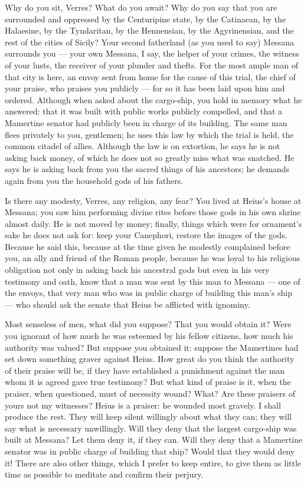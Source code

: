  Why do you sit, Verres? What do you await? Why do you say that you are surrounded and oppressed by the Centuripine state, by the Catinaean, by the Halaesine, by the Tyndaritan, by the Hennensian, by the Agyrinensian, and the rest of the cities of Sicily? Your second fatherland (as you used to say) Messana surrounds you --- your own Messana, I say, the helper of your crimes, the witness of your lusts, the receiver of your plunder and thefts. For the most ample man of that city is here, an envoy sent from home for the cause of this trial, the chief of your praise, who praises you publicly --- for so it has been laid upon him and ordered. Although when asked about the cargo-ship, you hold in memory what he answered: that it was built with public works publicly compelled, and that a Mamertine senator had publicly been in charge of its building. The same man flees privately to you, gentlemen; he uses this law by which the trial is held, the common citadel of allies. Although the law is on extortion, he says he is not asking back money, of which he does not so greatly miss what was snatched. He says he is asking back from you the sacred things of his ancestors; he demands again from you the household gods of his fathers.

 Is there any modesty, Verres, any religion, any fear? You lived at Heius's house at Messana; you saw him performing divine rites before those gods in his own shrine almost daily. He is not moved by money; finally, things which were for ornament's sake he does not ask for: keep your Canephori, restore the images of the gods. Because he said this, because at the time given he modestly complained before you, an ally and friend of the Roman people, because he was loyal to his religious obligation not only in asking back his ancestral gods but even in his very testimony and oath, know that a man was sent by this man to Messana --- one of the envoys, that very man who was in public charge of building this man's ship --- who should ask the senate that Heius be afflicted with ignominy.

 Most senseless of men, what did you suppose? That you would obtain it? Were you ignorant of how much he was esteemed by his fellow citizens, how much his authority was valued? But suppose you obtained it: suppose the Mamertines had set down something graver against Heius. How great do you think the authority of their praise will be, if they have established a punishment against the man whom it is agreed gave true testimony? But what kind of praise is it, when the praiser, when questioned, must of necessity wound? What? Are these praisers of yours not my witnesses? Heius is a praiser: he wounded most gravely. I shall produce the rest. They will keep silent willingly about what they can; they will say what is necessary unwillingly. Will they deny that the largest cargo-ship was built at Messana? Let them deny it, if they can. Will they deny that a Mamertine senator was in public charge of building that ship? Would that they would deny it! There are also other things, which I prefer to keep entire, to give them as little time as possible to meditate and confirm their perjury.

